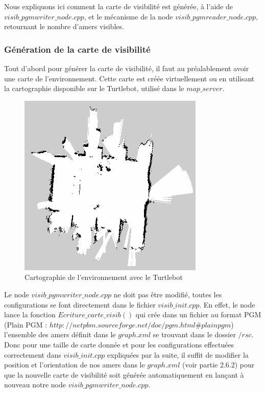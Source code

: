 \documentclass[10pt,a4paper]{article}
\begin{document}
Nous expliquons ici comment la carte de visibilité est générée, à l'aide de $visib\_pgmwriter\_node.cpp$, et le mécanisme de la node $visib\_pgmreader\_node.cpp$, retournant le nombre d'amers visibles.

\subsubsection{Génération de la carte de visibilité}
Tout d'abord pour générer la carte de visibilité, il faut au préalablement avoir une carte de l'environnement. Cette carte est créée virtuellement ou en utilisant la cartographie disponible sur le Turtlebot, utilisé dans le $map\_server$.

\begin{figure}[!h]
\center
\includegraphics[scale=0.6]{figures/aip_map.png} 
\caption{Cartographie de l'environnement avec le Turtlebot}	
\end{figure}

Le node $visib\_pgmwriter\_node.cpp$ ne doit pas être modifié, toutes les configurations se font directement dans le fichier $visib\_init.cpp$. En effet, le node lance la fonction $Ecriture\_carte\_visib()$ qui crée dans un fichier au format PGM (Plain PGM : $http://netpbm.sourceforge.net/doc/pgm.html\#plainpgm$) l'ensemble des amers définit dans le $graph.xml$ se trouvant dans le dossier $/rsc$. Donc pour une taille de carte donnée et pour les configurations effectuées correctement dans $visib\_init.cpp$  expliquées par la suite, il suffit de modifier la position et l'orientation de nos amers dans le $graph.xml$ (voir partie 2.6.2) pour que la nouvelle carte de visibilité soit générée automatiquement en lançant à nouveau notre node $visib\_pgmwriter\_node.cpp$.\\
\end{document}
